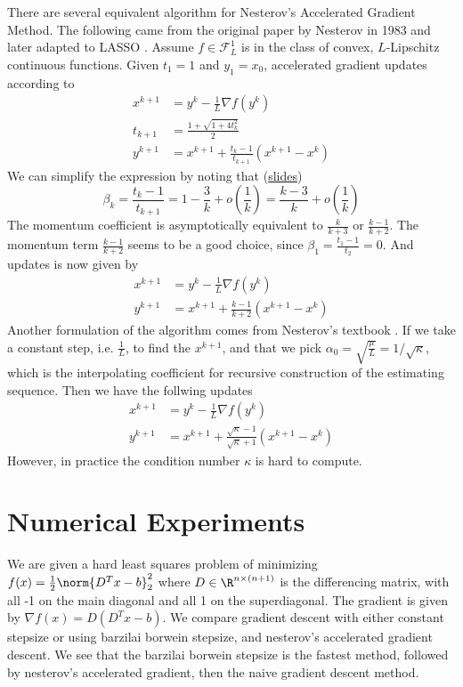 \documentclass[11pt]{article}
\newcommand\scrF{\ensuremath{\mathscr{F}}}
\begin{document}
There are several equivalent algorithm for Nesterov's Accelerated Gradient Method. The following came from the original paper by Nesterov in 1983 \cite{nesterovMethodSolvingConvex1983} and later adapted to LASSO \cite{beckFastIterativeShrinkageThresholding2009a}. Assume $f\in \scrF_{L}^1$ is in the class of convex, $L$-Lipschitz continuous functions. Given $t_1 = 1$ and $y_1 = x_0$, accelerated gradient updates according to
\begin{align*}
    x^{k+1}
        &= y^k - \frac{1}{L} \nabla f(y^k) \\
    t_{k+1} 
        &= \frac{1 + \sqrt{1 + 4t_k^2} }{2} \\
    y^{k+1}
        &= x^{k+1} + \frac{t_k - 1}{t_{k+1}} \left( x^{k+1} - x^{k} \right)
\end{align*}
We can simplify the expression by noting that (\href{http://www.princeton.edu/~yc5/ele522_optimization/lectures/accelerated_gradient.pdf}{slides})
\[
    \beta_k
        = \frac{t_k - 1}{t_{k+1}} 
        = 1 - \frac{3}{k} + o(\frac{1}{k})
        = \frac{k-3}{k} + o(\frac{1}{k})
\]
The momentum coefficient is asymptotically equivalent to $\frac{k}{k+3}$ or $\frac{k-1}{k+2}$. The momentum term $\frac{k-1}{k+2}$ seems to be a good choice, since $\beta_1 = \frac{t_1-1}{t_{2}} = 0$.
And updates is now given by
\begin{align*}  
    x^{k+1} 
        &= y^k - \frac{1}{L} \nabla f(y^k) \\
    y^{k+1}
        &= x^{k+1} + \frac{k-1}{k+2} \left( x^{k+1} - x^k \right)
\end{align*}
Another formulation of the algorithm comes from Nesterov's textbook \cite{nesterovIntroductoryLecturesConvex2004}. If we take a constant step, i.e. $\frac{1}{L}$, to find the $x^{k+1}$, and that we pick $\alpha_0 = \sqrt{\frac{\mu}{L}} = 1/\sqrt{\kappa}$, which is the interpolating coefficient for recursive construction of the estimating sequence. Then we have the follwing updates
\begin{align*}
    x^{k+1} 
        &=  y^k - \frac{1}{L} \nabla f(y^k) \\
    y^{k+1}
        &= x^{k+1} + \frac{\sqrt{\kappa} - 1}{\sqrt{\kappa} + 1} (x^{k+1} - x^k)
\end{align*}
However, in practice the condition number $\kappa$ is hard to compute.


\section{Numerical Experiments}

We are given a hard least squares problem of minimizing $f(x) = \frac{1}{2}\norm{D^Tx-b}_2^2$ where $D\in\R^{n\times (n+1)}$ is the differencing matrix, with all -1 on the main diagonal and all 1 on the superdiagonal. The gradient is given by $\nabla f(x) = D(D^Tx-b)$. We compare gradient descent with either constant stepsize or using barzilai borwein stepsize, and nesterov's accelerated gradient descent.
We see that the barzilai borwein stepsize is the fastest method, followed by nesterov's accelerated gradient, then the naive gradient descent method.

\printbibliography 
\end{document}
